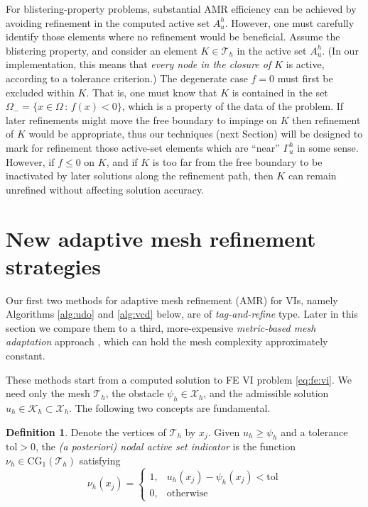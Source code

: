 \documentclass[]{interact}
\theoremstyle{plain}%
\theoremstyle{definition}
\newtheorem{definition}[theorem]{Definition}
\theoremstyle{remark}
\newcommand{\cK}{\mathcal{K}}
\newcommand{\cT}{\mathcal{T}}
\newcommand{\cX}{\mathcal{X}}
\newcommand{\CG}{\text{CG}}
\begin{document}
For blistering-property problems, substantial AMR efficiency can be achieved by avoiding refinement in the computed active set $A_u^h$.  However, one must carefully identify those elements where no refinement would be beneficial.  Assume the blistering property, and consider an element $K\in \cT_h$ in the active set $A_u^h$.  (In our implementation, this means that \emph{every node in the closure of $K$} is active, according to a tolerance criterion.)  The degenerate case $f=0$ must first be excluded within $K$.  That is, one must know that $K$ is contained in the set $\Omega_- = \{x\in \Omega\,:\,f(x) < 0\}$, which is a property of the data of the problem.  If later refinements might move the free boundary to impinge on $K$ then refinement of $K$ would be appropriate, thus our techniques (next Section) will be designed to mark for refinement those active-set elements which are ``near'' $\Gamma_u^h$ in some sense.  However, if $f \le 0$ on $K$, and if $K$ is too far from the free boundary to be inactivated by later solutions along the refinement path, then $K$ can remain unrefined without affecting solution accuracy.


\section{New adaptive mesh refinement strategies} \label{sec:viamr}

Our first two methods for adaptive mesh refinement (AMR) for VIs, namely Algorithms \ref{alg:udo} and \ref{alg:vcd} below, are of \emph{tag-and-refine} type.  Later in this section we compare them to a third, more-expensive \emph{metric-based mesh adaptation} approach \cite{Wallworketal2020}, which can hold the mesh complexity approximately constant.

These methods start from a computed solution to FE VI problem \eqref{eq:fe:vi}.  We need only the mesh $\cT_h$, the obstacle $\psi_h \in \cX_h$, and the admissible solution $u_h \in \cK_h \subset \cX_h$.  The following two concepts are fundamental.

\begin{definition} \label{def:nodalactive}
Denote the vertices of $\cT_h$ by $x_j$.  Given $u_h \ge \psi_h$ and a tolerance $\text{tol}>0$, the \emph{(a posteriori) nodal active set indicator} is the function $\nu_h\in\CG_1(\cT_h)$ satisfying
	$$\nu_h(x_j) = \begin{cases} 1, & u_h(x_j) - \psi_h(x_j) < \text{tol} \\
	                             0, & \text{otherwise}\end{cases}$$
\end{definition}
\end{document}
